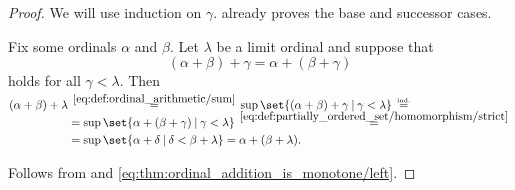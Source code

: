 \begin{proof}
   We will use induction on \( \gamma \).  already proves the base and successor cases.

  Fix some ordinals \( \alpha \) and \( \beta \). Let \( \lambda \) be a limit ordinal and suppose that
  \begin{equation*}
    (\alpha + \beta) + \gamma = \alpha + (\beta + \gamma)
  \end{equation*}
  holds for all \( \gamma < \lambda \). Then
  \begin{align*}
    (\alpha + \beta) + \lambda
    &\reloset {\eqref{eq:def:ordinal_arithmetic/sum}} =
    \sup\set{ (\alpha + \beta) + \gamma \given \gamma < \lambda }
    \reloset {\T{ind.}} = \\ &=
    \sup\set{ \alpha + (\beta + \gamma) \given \gamma < \lambda }
    \reloset {\eqref{eq:def:partially_ordered_set/homomorphism/strict}} = \\ &=
    \sup\set{ \alpha + \delta \given \delta < \beta + \lambda }
    =
    \alpha + (\beta + \lambda).
  \end{align*}

   Follows from  and \eqref{eq:thm:ordinal_addition_is_monotone/left}.
\end{proof}

